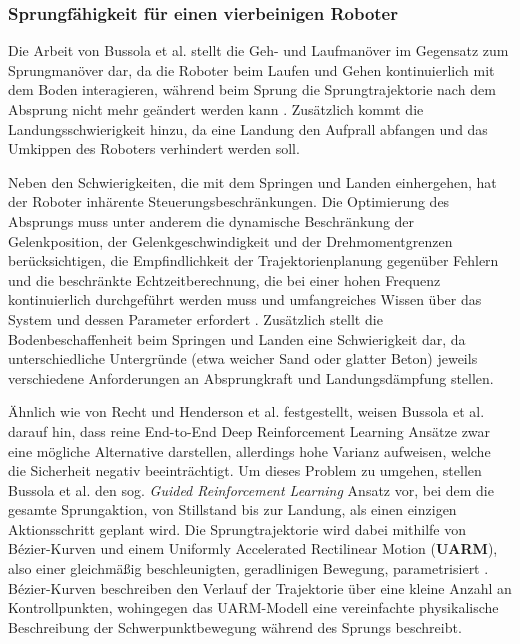 \subsubsection{Sprungfähigkeit für einen vierbeinigen Roboter} \label{sss:jump_ability}
Die Arbeit von Bussola et al. stellt die Geh- und Laufmanöver im Gegensatz zum Sprungmanöver dar, da die Roboter beim Laufen und Gehen kontinuierlich mit dem Boden interagieren, während beim Sprung die Sprungtrajektorie nach dem Absprung nicht mehr geändert werden kann \cite{bussolaGuidedReinforcementLearning2025}.
Zusätzlich kommt die Landungsschwierigkeit hinzu, da eine Landung den Aufprall abfangen und das Umkippen des Roboters verhindert werden soll.

Neben den Schwierigkeiten, die mit dem Springen und Landen einhergehen, hat der Roboter inhärente Steuerungsbeschränkungen. Die Optimierung des Absprungs muss unter anderem die dynamische Beschränkung der Gelenkposition, der Gelenkgeschwindigkeit und der Drehmomentgrenzen berücksichtigen, die Empfindlichkeit der Trajektorienplanung gegenüber Fehlern und die beschränkte Echtzeitberechnung, die bei einer hohen Frequenz kontinuierlich durchgeführt werden muss und umfangreiches Wissen über das System und dessen Parameter erfordert \cite{bussolaGuidedReinforcementLearning2025}. Zusätzlich stellt die Bodenbeschaffenheit beim Springen und Landen eine Schwierigkeit dar, da unterschiedliche Untergründe (etwa weicher Sand oder glatter Beton) jeweils verschiedene Anforderungen an Absprungkraft und Landungsdämpfung stellen.

Ähnlich wie von Recht \cite{rechtTourReinforcementLearning2018} und Henderson et al. \cite{hendersonDeepReinforcementLearning2019} festgestellt, weisen Bussola et al. darauf hin, dass reine End-to-End Deep Reinforcement Learning Ansätze zwar eine mögliche Alternative darstellen, allerdings hohe Varianz aufweisen, welche die Sicherheit negativ beeinträchtigt.\newline
Um dieses Problem zu umgehen, stellen Bussola et al. den sog. \textit{Guided Reinforcement Learning} Ansatz vor, bei dem die gesamte Sprungaktion, von Stillstand bis zur Landung, als einen einzigen Aktionsschritt geplant wird. Die Sprungtrajektorie wird dabei mithilfe von Bézier-Kurven und einem Uniformly Accelerated Rectilinear Motion (\textbf{UARM}), also einer gleichmäßig beschleunigten, geradlinigen Bewegung, parametrisiert \cite{bussolaGuidedReinforcementLearning2025}. \newline
Bézier-Kurven beschreiben den Verlauf der Trajektorie über eine kleine Anzahl an Kontrollpunkten, wohingegen das UARM-Modell eine vereinfachte physikalische Beschreibung der Schwerpunktbewegung während des Sprungs beschreibt.

